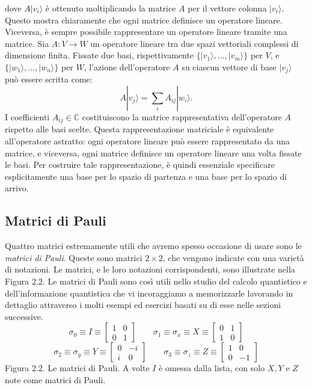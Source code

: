 \documentclass[a4paper,12pt]{report}
\theoremstyle{plain}
\begin{document}
dove \( A |v_i\rangle \) è ottenuto moltiplicando la matrice \( A \) per il vettore colonna \( |v_i\rangle \). Questo mostra chiaramente che ogni matrice definisce un operatore lineare.
Viceversa, è sempre possibile rappresentare un operatore lineare tramite una matrice. Sia \( A : V \rightarrow W \) un operatore lineare tra due spazi vettoriali complessi di dimensione finita. Fissate due basi, rispettivamente \( \{|v_1\rangle, \ldots, |v_m\rangle\} \) per \( V \), e \( \{|w_1\rangle, \ldots, |w_n\rangle\} \) per \( W \), l'azione dell'operatore \( A \) su ciascun vettore di base \( |v_j\rangle \) può essere scritta come:
\[A |v_j\rangle = \sum_i A_{ij} |w_i\rangle.\]
I coefficienti \( A_{ij} \in \mathbb{C} \) costituiscono la matrice rappresentativa dell'operatore \( A \) rispetto alle basi scelte. Questa rappresentazione matriciale è equivalente all'operatore astratto: ogni operatore lineare può essere rappresentato da una matrice, e viceversa, ogni matrice definisce un operatore lineare una volta fissate le basi.
Per costruire tale rappresentazione, è quindi essenziale specificare esplicitamente una base per lo spazio di partenza e una base per lo spazio di arrivo.

\subsection{Matrici di Pauli}
Quattro matrici estremamente utili che avremo spesso occasione di usare sono le \textit{matrici di Pauli}. Queste sono matrici $2 \times 2$, che vengono indicate con una varietà di notazioni. Le matrici, e le loro notazioni corrispondenti, sono illustrate nella Figura 2.2. Le matrici di Pauli sono così utili nello studio del calcolo quantistico e dell'informazione quantistica che vi incoraggiamo a memorizzarle lavorando in dettaglio attraverso i molti esempi ed esercizi basati su di esse nelle sezioni successive.
$$ \sigma_0 \equiv I \equiv \begin{bmatrix} 1 & 0 \\ 0 & 1 \end{bmatrix} \qquad \sigma_1 \equiv \sigma_x \equiv X \equiv \begin{bmatrix} 0 & 1 \\ 1 & 0 \end{bmatrix} $$
$$ \sigma_2 \equiv \sigma_y \equiv Y \equiv \begin{bmatrix} 0 & -i \\ i & 0 \end{bmatrix} \qquad \sigma_3 \equiv \sigma_z \equiv Z \equiv \begin{bmatrix} 1 & 0 \\ 0 & -1 \end{bmatrix} $$
Figura 2.2. Le matrici di Pauli. A volte $I$ è omessa dalla lista, con solo $X, Y$ e $Z$ note come matrici di Pauli.
\end{document}
